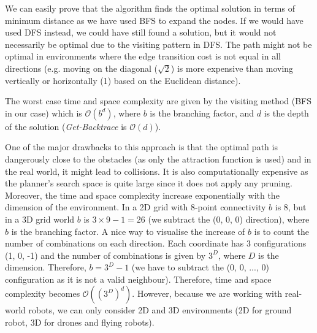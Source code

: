 We can easily prove that the algorithm finds the optimal solution in terms of minimum distance as we have used BFS to expand the nodes. If we would have used DFS instead, we could have still found a solution, but it would not necessarily be optimal due to the visiting pattern in DFS. The path might not be optimal in environments where the edge transition cost is not equal in all directions (e.g. moving on the diagonal ($\sqrt{2}$) is more expensive than moving vertically or horizontally (1) based on the Euclidean distance).

The worst case time and space complexity are given by the visiting method (BFS in our case) which is $\mathcal{O}(b^d)$, where $b$ is the branching factor, and $d$ is the depth of the solution (\textit{Get-Backtrace} is $\mathcal{O}(d)$).

One of the major drawbacks to this approach is that the optimal path is dangerously close to the obstacles (as only the attraction function is used) and in the real world, it might lead to collisions. It is also computationally expensive as the planner's search space is quite large since it does not apply any pruning. Moreover, the time and space complexity increase exponentially with the dimension of the environment. In a 2D grid with 8-point connectivity $b$ is 8, but in a 3D grid world $b$ is $3 \times 9 - 1 = 26$ (we subtract the (0, 0, 0) direction), where $b$ is the branching factor. A nice way to visualise the increase of $b$ is to count the number of combinations on each direction. Each coordinate has 3 configurations (1, 0, -1) and the number of combinations is given by $3^D$, where $D$ is the dimension. Therefore, $b = 3^D - 1$ (we have to subtract the (0, 0, ..., 0) configuration as it is not a valid neighbour). Therefore, time and space complexity becomes $\mathcal{O}((3^D)^d)$. However, because we are working with real-world robots, we can only consider 2D and 3D environments (2D for ground robot, 3D for drones and flying robots).


